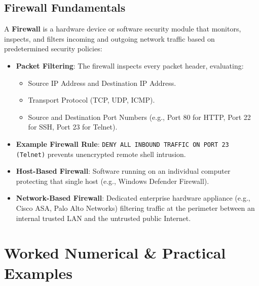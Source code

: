 \subsection{Firewall Fundamentals}

A \textbf{Firewall} is a hardware device or software security module that monitors, inspects, and filters incoming and outgoing network traffic based on predetermined security policies:
\begin{itemize}[leftmargin=1.5em]
    \item \textbf{Packet Filtering}: The firewall inspects every packet header, evaluating:
    \begin{itemize}
        \item Source IP Address and Destination IP Address.
        \item Transport Protocol (TCP, UDP, ICMP).
        \item Source and Destination Port Numbers (e.g., Port 80 for HTTP, Port 22 for SSH, Port 23 for Telnet).
    \end{itemize}
    \item \textbf{Example Firewall Rule}: \texttt{DENY ALL INBOUND TRAFFIC ON PORT 23 (Telnet)} prevents unencrypted remote shell intrusion.
    \item \textbf{Host-Based Firewall}: Software running on an individual computer protecting that single host (e.g., Windows Defender Firewall).
    \item \textbf{Network-Based Firewall}: Dedicated enterprise hardware appliance (e.g., Cisco ASA, Palo Alto Networks) filtering traffic at the perimeter between an internal trusted LAN and the untrusted public Internet.
\end{itemize}

\section{Worked Numerical \& Practical Examples}

